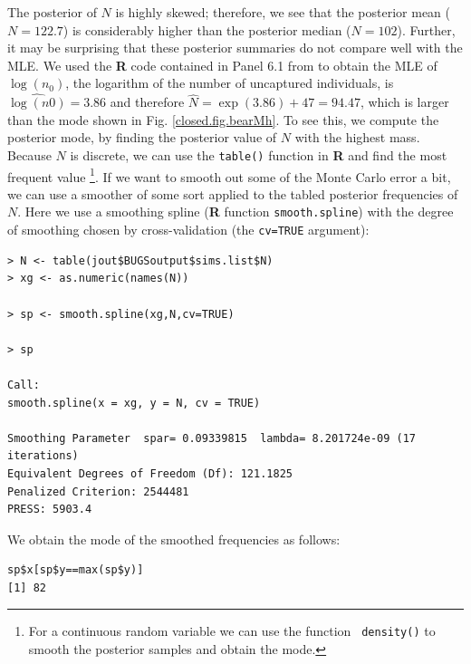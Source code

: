 The posterior of $N$ is highly skewed; therefore, we see that the
posterior mean
($N=122.7$) is considerably higher than the posterior median
($N=102$).
Further, it may be surprising that these posterior
summaries do not compare well with the MLE.
We used
the {\bf R} code contained in Panel 6.1 from
\citet{royle_dorazio:2008} to obtain the
MLE of $\log(n_{0})$, the logarithm of the number of uncaptured
individuals, is $\widehat{\log(n0)} = 3.86$ and therefore $\hat{N} =
\exp(3.86)+47 = 94.47$, which is larger than the mode
shown in Fig. \ref{closed.fig.bearMh}.
To see this, we compute the posterior mode, by finding
the posterior value of $N$ with the highest mass.
 Because $N$ is discrete, we can  use
the \mbox{\tt table()} function in {\bf R} and find the most frequent value
\footnote{For a continuous random variable we can use the function
 \mbox{\tt
    density()} to smooth the posterior samples and obtain the mode.}.
If we want to smooth out some of the Monte
Carlo error a bit, we can use a smoother of some sort applied to the tabled
posterior frequencies of $N$. Here we use a smoothing spline ({\bf R}
function \mbox{\tt smooth.spline}) with the
degree of smoothing chosen by cross-validation (the \mbox{\tt cv=TRUE}
argument):
{\small
\begin{verbatim}
> N <- table(jout$BUGSoutput$sims.list$N)
> xg <- as.numeric(names(N))

> sp <- smooth.spline(xg,N,cv=TRUE)

> sp

Call:
smooth.spline(x = xg, y = N, cv = TRUE)

Smoothing Parameter  spar= 0.09339815  lambda= 8.201724e-09 (17 iterations)
Equivalent Degrees of Freedom (Df): 121.1825
Penalized Criterion: 2544481
PRESS: 5903.4
\end{verbatim}
}
We obtain the mode of the smoothed frequencies as follows:
\begin{verbatim}
sp$x[sp$y==max(sp$y)]
[1] 82
\end{verbatim}




